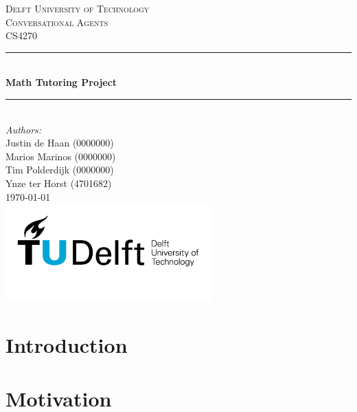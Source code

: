 \documentclass[a4paper]{article}
\begin{document}
\begin{titlepage}

\newcommand{\HRule}{\rule{\linewidth}{0.5mm}} 							%
\center 
 
\textsc{\LARGE Delft University of Technology}\\[1cm]

\textsc{\Large Conversational Agents}\\[0.2cm]
\textsc{\large CS4270}\\[1cm] 										%
\HRule \\[0.8cm]
{ \huge \bfseries Math Tutoring Project}\\[0.7cm]								%
\HRule \\[2cm]
\large
\emph{Authors:}\\[0.5cm]
Justin de Haan (0000000)\\[0cm]
Marios Marinos (0000000)\\[0cm]
Tim Polderdijk (0000000)\\[0cm]
Ynze ter Horst (4701682)\\[0.5cm]
{\large \today}\\[5cm]
\includegraphics[width=0.6\textwidth]{images/TU_delft_logo.jpg}\\[1cm] 	%
\vfill 
\end{titlepage}


\section*{Introduction}


\section*{Motivation}
\end{document}
